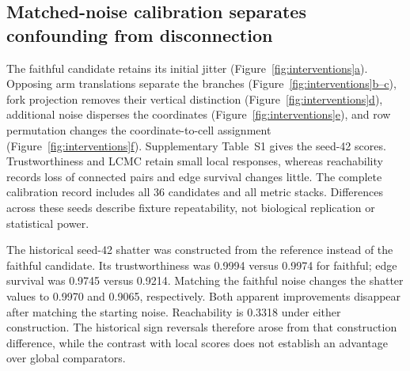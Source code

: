 \documentclass[11pt]{article}
\newcommand{\figpanel}[2]{Figure~\hyperref[#1]{\ref*{#1}#2}}
\begin{document}
\subsection{Matched-noise calibration separates confounding from disconnection}

The faithful candidate retains its initial jitter (\figpanel{fig:interventions}{a}). Opposing arm translations separate the branches (\figpanel{fig:interventions}{b--c}), fork projection removes their vertical distinction (\figpanel{fig:interventions}{d}), additional noise disperses the coordinates (\figpanel{fig:interventions}{e}), and row permutation changes the coordinate-to-cell assignment (\figpanel{fig:interventions}{f}). Supplementary Table~S1 gives the seed-42 scores. Trustworthiness and LCMC retain small local responses, whereas reachability records loss of connected pairs and edge survival changes little. The complete calibration record includes all 36 candidates and all metric stacks. Differences across these seeds describe fixture repeatability, not biological replication or statistical power.





The historical seed-42 shatter was constructed from the reference instead of the faithful candidate. Its trustworthiness was 0.9994 versus 0.9974 for faithful; edge survival was 0.9745 versus 0.9214. Matching the faithful noise changes the shatter values to 0.9970 and 0.9065, respectively. Both apparent improvements disappear after matching the starting noise. Reachability is 0.3318 under either construction. The historical sign reversals therefore arose from that construction difference, while the contrast with local scores does not establish an advantage over global comparators.
\end{document}

